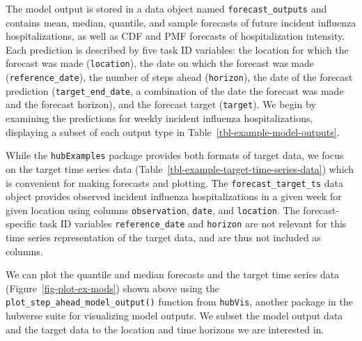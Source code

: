 \documentclass[
]{article}
\begin{document}
The model output is stored in a data object named
\texttt{forecast\_outputs} and contains mean, median, quantile, and
sample forecasts of future incident influenza hospitalizations, as well
as CDF and PMF forecasts of hospitalization intensity. Each prediction
is described by five task ID variables: the location for which the
forecast was made (\texttt{location}), the date on which the forecast
was made (\texttt{reference\_date}), the number of steps ahead
(\texttt{horizon}), the date of the forecast prediction
(\texttt{target\_end\_date}, a combination of the date the forecast was
made and the forecast horizon), and the forecast target
(\texttt{target}). We begin by examining the predictions for weekly
incident influenza hospitalizations, displaying a subset of each output
type in Table~\ref{tbl-example-model-outputs}.

While the \texttt{hubExamples} package provides both formats of target
data, we focus on the target time series data
(Table~\ref{tbl-example-target-time-series-data}) which is convenient
for making forecasts and plotting. The \texttt{forecast\_target\_ts}
data object provides observed incident influenza hospitalizations in a
given week for given location using columns \texttt{observation},
\texttt{date}, and \texttt{location}. The forecast-specific task ID
variables \texttt{reference\_date} and \texttt{horizon} are not relevant
for this time series representation of the target data, and are thus not
included as columns.

We can plot the quantile and median forecasts and the target time series
data (Figure~\ref{fig-plot-ex-mods}) shown above using the
\texttt{plot\_step\_ahead\_model\_output()} function from
\texttt{hubVis}, another package in the hubverse suite for visualizing
model outputs. We subset the model output data and the target data to
the location and time horizons we are interested in.
\end{document}

